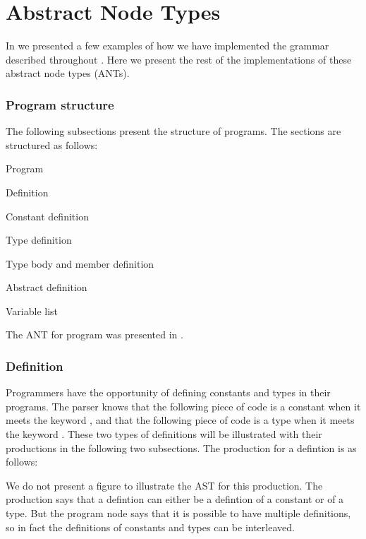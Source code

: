 \section{Abstract Node Types}
\label{ap:ant}

In  we presented a few examples of how we have implemented the
grammar described throughout . Here we present the rest of the
implementations of these abstract node types (ANTs). 

\subsubsection{Program structure}
The following subsections present the structure of programs. The sections are 
structured as follows:

\begin{dlist}
  \item Program
  \item Definition
  \item Constant definition
  \item Type definition
  \item Type body and member definition
  \item Abstract definition
  \item Variable list
\end{dlist}

The ANT for program was presented in .

\subsubsection{Definition}
Programmers have the opportunity of defining constants and types in their
programs.  The parser knows that the following piece of code is a constant when
it meets the keyword , and that the following piece of code is a
type when it meets the keyword . These two types of definitions will
be illustrated with their productions in the following two subsections. The 
production for a defintion is as follows:

\begin{ebnf}
\end{ebnf}

We do not present a figure to illustrate the AST for this production. The
production says that a defintion can either be a defintion of a constant or of a
type. But the program node says that it is possible to have multiple
definitions, so in fact the definitions of constants and types can be
interleaved.

